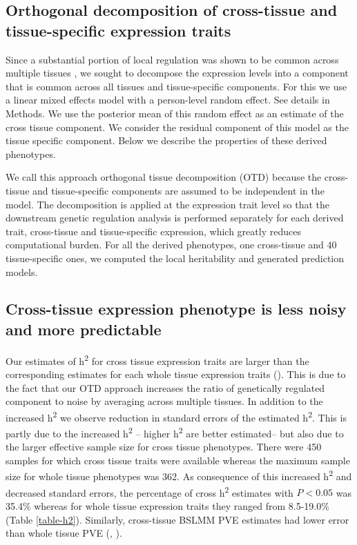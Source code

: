\documentclass[10pt,letterpaper]{article}
\begin{document}
\subsection*{Orthogonal decomposition of cross-tissue and tissue-specific expression traits}

Since a substantial portion of local regulation was shown to be common across multiple tissues \cite{Ardlie_2015}, we sought to decompose the expression levels into a component that is common across all tissues and tissue-specific components. For this we use a linear mixed effects model with a person-level random effect. See details in Methods. We use the posterior mean of this random effect as an estimate of the cross tissue component. We consider the residual component of this model as the tissue specific component. Below we describe the properties of these derived phenotypes.

We call this approach orthogonal tissue decomposition (OTD) because the cross-tissue and tissue-specific components are assumed to be independent in the model. The decomposition is applied at the expression trait level so that the downstream genetic regulation analysis is performed separately for each derived trait, cross-tissue and tissue-specific expression, which greatly reduces computational burden. For all the derived phenotypes, one cross-tissue and 40 tissue-specific ones, we computed the local heritability and generated prediction models.

\subsection*{Cross-tissue expression phenotype is less noisy and more predictable}%

Our estimates of h\textsuperscript{2} for cross tissue expression traits are larger than the corresponding estimates for each whole tissue expression traits ().
This is due to the fact that our OTD approach increases the ratio of genetically regulated component to noise by averaging across multiple tissues. In addition to the increased h\textsuperscript{2} we observe reduction in standard errors of the estimated h\textsuperscript{2}. This is partly due to the increased h\textsuperscript{2} -- higher h\textsuperscript{2} are better estimated-- but also due to the larger effective sample size for cross tissue phenotypes. There were 450 samples for which cross tissue traits were available whereas the maximum sample size for whole tissue phenotypes was 362. As consequence of this increased h\textsuperscript{2} and decreased standard errors, the percentage of cross h\textsuperscript{2} estimates with $P < 0.05$ was 35.4\% whereas for whole tissue expression traits they ranged from 8.5-19.0\% (Table \ref{table-h2}). Similarly, cross-tissue BSLMM PVE estimates had lower error than whole tissue PVE (, ). 
\end{document}
